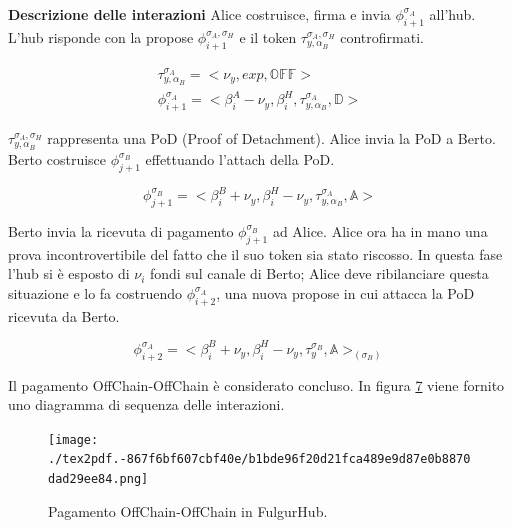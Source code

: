 \documentclass[12pt,italian,]{book}
\begin{document}
\textbf{\textbf{Descrizione delle interazioni}} Alice costruisce, firma e invia \(\phi^{\sigma_A}_{i+1}\) all'hub. L'hub risponde con la propose \(\phi^{\sigma_A,\sigma_H}_{i+1}\) e il token \(\tau^{\sigma_A,\sigma_H}_{y, \alpha_B}\) controfirmati.

\begin{equation}
\begin{aligned}
\label{Propose detach pagamento OffChain-OffChain}
\tau^{\sigma_A}_{y, \alpha_B} =  <\nu_y, exp, \mathbb{OFF}>\\
\phi^{\sigma_A}_{i+1} = <\beta^A_i-\nu_y, \beta^H_i, \tau^{\sigma_A}_{y, \alpha_B} ,\mathbb{D}>
\end{aligned}
\end{equation}

\(\tau^{\sigma_A,\sigma_H}_{y, \alpha_B}\) rappresenta una PoD (Proof of Detachment). Alice invia la PoD a Berto. Berto costruisce \(\phi^{\sigma_B}_{j+1}\) effettuando l'attach della PoD.

\begin{equation}
\label{Propose attach pagamento OffChain-OffChain}
\phi^{\sigma_B}_{j+1} = <\beta^B_i+\nu_y, \beta^H_i-\nu_y, \tau^{\sigma_A}_{y, \alpha_B} ,\mathbb{A}>
\end{equation}

Berto invia la ricevuta di pagamento \(\phi^{\sigma_B}_{j+1}\) ad Alice. Alice ora ha in mano una prova incontrovertibile del fatto che il suo token sia stato riscosso. In questa fase l'hub si è esposto di \(\nu_i\) fondi sul canale di Berto; Alice deve ribilanciare questa situazione e lo fa costruendo \(\phi^{\sigma_A}_{i+2}\), una nuova propose in cui attacca la PoD ricevuta da Berto.

\begin{equation}
\label{Propose attach pagamento OffChain-OffChain}
\phi^{\sigma_A}_{i+2} = <\beta^B_i+\nu_y, \beta^H_i-\nu_y, \tau^{\sigma_B}_y ,\mathbb{A}>_(\sigma_B)
\end{equation}

Il pagamento OffChain-OffChain è considerato concluso. In figura \protect\hyperlink{caso-duso-offchain-offchain}{7} viene fornito uno diagramma di sequenza delle interazioni.

\begin{figure}
\centering
\texttt{[image: ./tex2pdf.-867f6bf607cbf40e/b1bde96f20d21fca489e9d87e0b8870dad29ee84.png]}
\caption{\protect\hypertarget{caso-duso-offchain-offchain}{}{}Pagamento OffChain-OffChain in FulgurHub.}
\end{figure}
\end{document}
